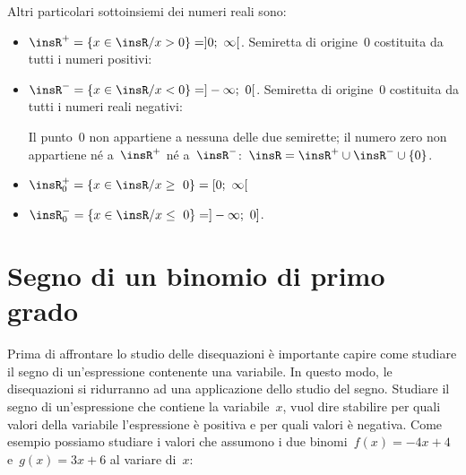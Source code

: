 \begin{esempio}
Altri particolari sottoinsiemi dei numeri reali sono:

\begin{itemize} [noitemsep]
\item $\insR^{+}=\{x\in \insR/x>0\} = ]0;~\infty[$. 
Semiretta di origine~0 costituita da tutti i numeri positivi:
\begin{center}
 
\end{center}
\item $\insR^{-}=\{x\in \insR/x<0\} = ]- \infty;~0[$. 
Semiretta di origine~0 costituita da tutti i numeri reali negativi:
\begin{center}
 
\end{center}
\subitem Il punto~0 non appartiene a nessuna delle due semirette; il numero 
 zero non appartiene né 
 a~$\insR^{+}$ né a~$\insR^{-}$:~$\insR=\insR^{+}\cup\insR^{-}\cup\{0\}$.
\item $\insR_{0}^{+}=\{x\in \insR/x\ge~0\} = [0;~\infty[$
\item $\insR_{0}^{-}=\{x\in \insR/x\le~0\} = ]- \infty;~0]$.
\end{itemize}
\end{esempio}


\section{Segno di un binomio di primo grado}
\label{sec:dis_binomio}

Prima di affrontare lo studio delle disequazioni è importante capire come 
studiare il segno di un'espressione contenente una variabile. 
In questo modo, le disequazioni si ridurranno ad una applicazione dello 
studio del segno.
Studiare il segno di un'espressione che contiene la variabile~$x$, vuol dire 
stabilire per quali valori della variabile l'espressione è positiva e per 
quali valori è negativa.
Come esempio possiamo studiare i valori che assumono i due 
binomi~$f(x) = -4 x +4$ e~$g(x) = 3 x +6$ al variare di~$x$:

